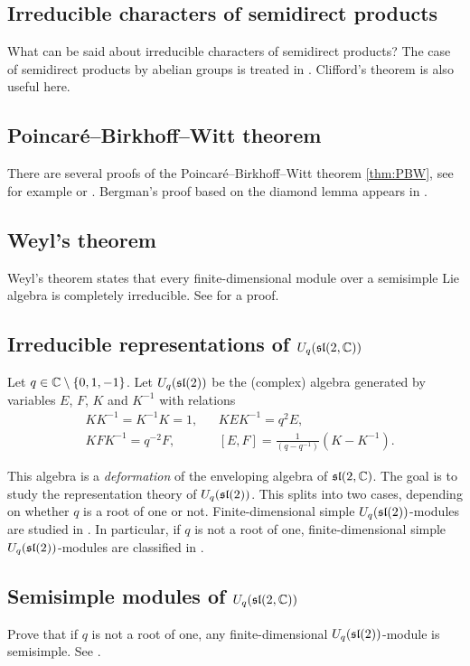 \subsection*{Irreducible characters of semidirect products}

What can be said about irreducible characters
of semidirect products? The case of 
semidirect products by abelian groups is treated 
in \cite[Section 8.2]{MR0450380}. Clifford's theorem is also useful 
here. 

\subsection*{Poincar\'e--Birkhoff--Witt theorem}

There are several proofs of the
Poincar\'e--Birkhoff--Witt theorem \ref{thm:PBW}, see for example 
\cite[\S17.4]{MR499562} or \cite[Theorem 2.17]{MR938524}. 
Bergman's proof based on the diamond lemma 
appears in \cite{MR506890}. 

\subsection*{Weyl's theorem}

Weyl's theorem states that every finite-dimensional module over
a semisimple Lie algebra is completely irreducible. 
See \cite[Theorem 17.4]{MR2218355} for a proof. 

\subsection*{Irreducible representations of $U_q(\sl(2,\C))$}

Let $q\in\C\setminus\{0,1,-1\}$. 
Let $U_q(\sl(2))$ be the (complex) algebra generated by 
variables $E$, $F$, $K$ and $K^{-1}$ with relations
\begin{align*}
    &KK^{-1}=K^{-1}K=1,
    &&
    KEK^{-1}=q^2E,\\
    &
    KFK^{-1}=q^{-2}F,
    &&
    [E,F]=\frac{1}{(q-q^{-1})}(K-K^{-1}).
\end{align*}

This algebra is a \emph{deformation} of the enveloping algebra
of $\sl(2,\C)$. The goal is to study the 
representation theory of $U_q(\sl(2))$. This splits into
two cases, depending on whether $q$ is a root of one or not. 
Finite-dimensional simple $U_q(\sl(2))$-modules are studied 
in \cite[VI]{MR1321145}. In particular, if 
$q$ is not a root of one, finite-dimensional simple $U_q(\sl(2))$-modules
are classified in \cite[Theorem VI.3.5]{MR1321145}. 

\subsection*{Semisimple modules of $U_q(\sl(2,\C))$}

Prove that if $q$ is not a root of one, any finite-dimensional
$U_q(\sl(2))$-module is semisimple. 
See \cite[Theorem VII.2.2]{MR1321145}. 